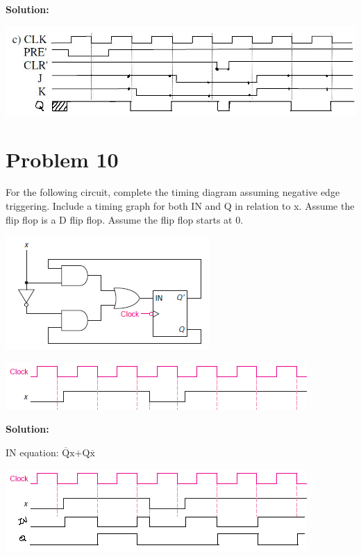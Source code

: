 \documentclass{article}
\begin{document}
    \textbf{Solution:}

    \begin{center}
        \includegraphics[width=\linewidth]{HW4_q9.4.1.png}
    \end{center}



    \section*{Problem 10}

    For the following circuit, complete the timing diagram assuming negative edge 
    triggering. Include a timing graph for both IN and Q in relation to x. Assume the 
    flip flop is a D flip flop. Assume the flip flop starts at 0.

    \begin{center}
        \includegraphics[scale=0.75]{HW4_q10.1.png}
    \end{center}

    \begin{center}
        \includegraphics[width=\linewidth]{HW4_q10.2.png}
    \end{center}

    \textbf{Solution:}

    IN equation: $\overline{\text{Q}}\text{x+Q}\overline{\text{x}}$

    \begin{center}
        \includegraphics[width=\linewidth]{HW4_q10.2.1.png}
    \end{center}
\end{document}
